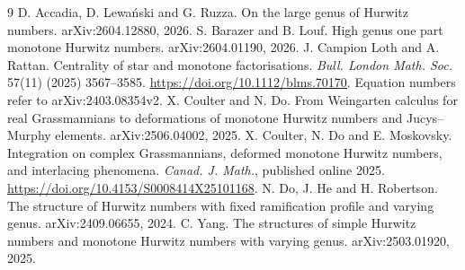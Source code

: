 \documentclass[11pt,a4paper]{article}
\theoremstyle{definition}\newtheorem{definition}[theorem]{Definition}
\theoremstyle{remark}\newtheorem{remark}[theorem]{Remark}\newtheorem{example}[theorem]{Example}
\numberwithin{equation}{section}
\begin{document}
\begin{thebibliography}{9}
 D. Accadia, D. Lewa\'nski and G. Ruzza. On the large genus of Hurwitz numbers. arXiv:2604.12880, 2026.
 S. Barazer and B. Louf. High genus one part monotone Hurwitz numbers. arXiv:2604.01190, 2026.
 J. Campion Loth and A. Rattan. Centrality of star and monotone factorisations. \textit{Bull. London Math. Soc.} 57(11) (2025) 3567--3585. \url{https://doi.org/10.1112/blms.70170}. Equation numbers refer to arXiv:2403.08354v2.
 X. Coulter and N. Do. From Weingarten calculus for real Grassmannians to deformations of monotone Hurwitz numbers and Jucys--Murphy elements. arXiv:2506.04002, 2025.
 X. Coulter, N. Do and E. Moskovsky. Integration on complex Grassmannians, deformed monotone Hurwitz numbers, and interlacing phenomena. \textit{Canad. J. Math.}, published online 2025. \url{https://doi.org/10.4153/S0008414X25101168}.
 N. Do, J. He and H. Robertson. The structure of Hurwitz numbers with fixed ramification profile and varying genus. arXiv:2409.06655, 2024.
 C. Yang. The structures of simple Hurwitz numbers and monotone Hurwitz numbers with varying genus. arXiv:2503.01920, 2025.
\end{thebibliography}
\end{document}
